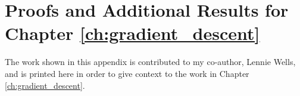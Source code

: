 \graphicspath{{chapters/gradient_descent/}}
\chapter{Proofs and Additional Results for Chapter \ref{ch:gradient_descent}}\label{app:gradient_descent}

The work shown in this appendix is contributed to my co-author, Lennie Wells, and is printed here in order to give context to the work in Chapter \ref{ch:gradient_descent}.







